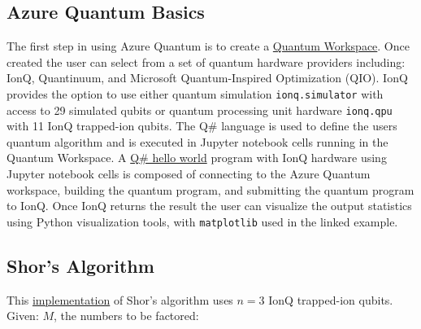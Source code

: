 \documentclass[main.tex]{subfiles}
\begin{document}
\subsection{Azure Quantum Basics} 

    The first step in using Azure Quantum is to create a \href{https://portal.azure.com/#create/Microsoft.AzureQuantum}{Quantum Workspace}. Once created the user can select from a set of quantum hardware providers including: IonQ, Quantinuum, and Microsoft Quantum-Inspired Optimization (QIO). IonQ provides the option to use either quantum simulation \texttt{ionq.simulator} with access to 29  simulated qubits or quantum processing unit hardware \texttt{ionq.qpu} with 11 IonQ trapped-ion qubits. The Q\# language is used to define the users quantum algorithm and is executed in Jupyter notebook cells running in the Quantum Workspace. A  \href{https://github.com/jwcrandall/csci-6907-quantum-computing-project/blob/main/hello-world-qsharp-ionq.ipynb}{Q\# hello world} program with IonQ hardware using Jupyter notebook cells is composed of connecting to the Azure Quantum workspace, building the quantum program, and submitting the quantum program to IonQ. Once IonQ returns the result the user can visualize the output statistics using Python visualization tools, with \texttt{matplotlib} used in the linked example.
    

\subsection{Shor's Algorithm}

    This \href{https://github.com/jwcrandall/csci-6907-quantum-computing-project/blob/main/shors-algorithm.ipynb}{implementation} of Shor's algorithm uses $n=3$ IonQ trapped-ion qubits. Given: $M$, the numbers to be factored:
    
\end{document}
